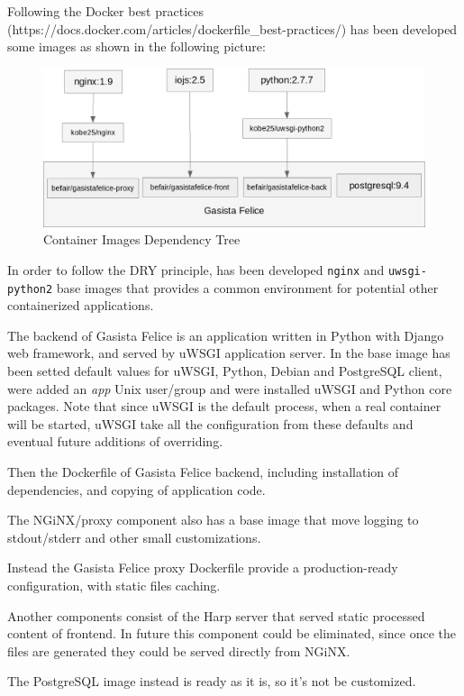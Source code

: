 Following the Docker best practices
(https://docs.docker.com/articles/dockerfile\_best-practices/) has been
developed some images as shown in the following picture:

\begin{figure}[htbp]
\centering
\includegraphics{media/ch3-images_tree.png}
\caption{Container Images Dependency Tree}
\end{figure}

In order to follow the DRY principle, has been developed \texttt{nginx}
and \texttt{uwsgi-python2} base images that provides a common
environment for potential other containerized applications.

The backend of Gasista Felice is an application written in Python with
Django web framework, and served by uWSGI application server. In the
base image has been setted default values for uWSGI, Python, Debian and
PostgreSQL client, were added an \emph{app} Unix user/group and were
installed uWSGI and Python core packages. Note that since uWSGI is the
default process, when a real container will be started, uWSGI take all
the configuration from these defaults and eventual future additions of
overriding.

Then the Dockerfile of Gasista Felice backend, including installation of
dependencies, and copying of application code.

The NGiNX/proxy component also has a base image that move logging to
stdout/stderr and other small customizations.

Instead the Gasista Felice proxy Dockerfile provide a production-ready
configuration, with static files caching.

Another components consist of the Harp server that served static
processed content of frontend. In future this component could be
eliminated, since once the files are generated they could be served
directly from NGiNX.

The PostgreSQL image instead is ready as it is, so it's not be
customized.

